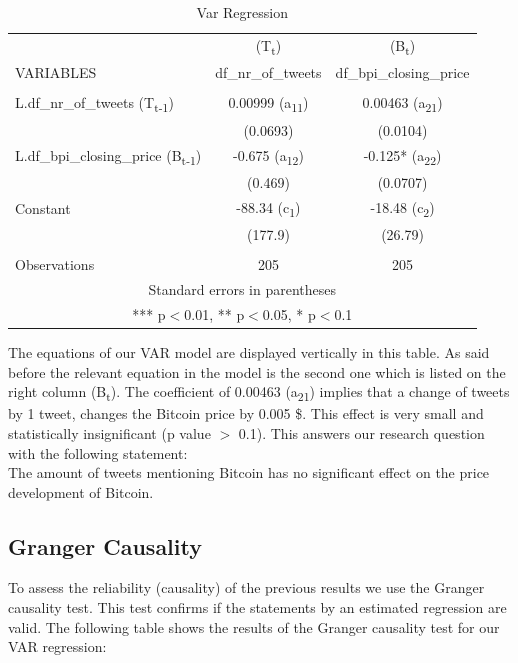 \documentclass[a4paper,american,12pt]{article}
\begin{document}
\begin{spacing}{1.2}
\begin{table}[H]
\centering
	\begin{tabular}{lcc} \hline
	 & (T\textsubscript{t}) & (B\textsubscript{t}) \\
	VARIABLES & df\_nr\_of\_tweets & df\_bpi\_closing\_price \\ \hline
	 &  &  \\
	L.df\_nr\_of\_tweets (T\textsubscript{t-1}) & 0.00999 (a\textsubscript{11}) & 0.00463 (a\textsubscript{21}) \\
	 & (0.0693) & (0.0104) \\
	L.df\_bpi\_closing\_price (B\textsubscript{t-1}) & -0.675 (a\textsubscript{12}) & -0.125* (a\textsubscript{22}) \\
	 & (0.469) & (0.0707) \\
	Constant  & -88.34 (c\textsubscript{1}) & -18.48 (c\textsubscript{2}) \\
	 & (177.9) & (26.79) \\
	 &  &  \\
	 Observations & 205 & 205 \\ \hline
	\multicolumn{3}{c}{ Standard errors in parentheses} \\
	\multicolumn{3}{c}{ *** p$<$0.01, ** p$<$0.05, * p$<$0.1} \\
	\end{tabular}
\caption{Var Regression}
\end{table}

The equations of our VAR model are displayed vertically in this table. As said before the relevant equation in the model is the second one which is listed on the right column (B\textsubscript{t}). The coefficient of 0.00463 (a\textsubscript{21}) implies that a change of tweets by 1 tweet, changes the Bitcoin price by 0.005 \$. This effect is very small and statistically insignificant (p value $>$ 0.1). This answers our research question with the following statement:\\ The amount of tweets mentioning Bitcoin has no significant effect on the price development of Bitcoin.
		
\subsection{Granger Causality}
To assess the reliability (causality) of the previous results we use the Granger causality test. This test confirms if the statements by an estimated regression are valid. The following table shows the results of the Granger causality test for our VAR regression:\\


\end{spacing}
\end{document}
